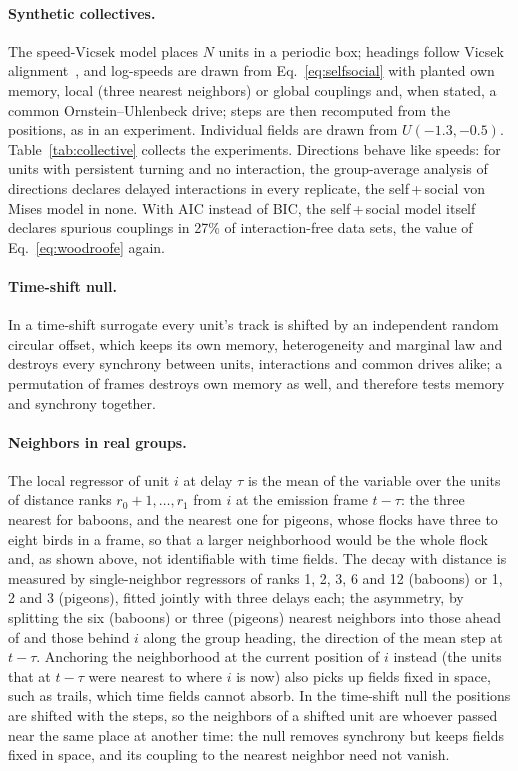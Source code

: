 \paragraph{Synthetic collectives.} The speed-Vicsek model places $N$ units in a periodic box; headings follow Vicsek alignment~\cite{Vicsek1995}, and log-speeds are drawn from Eq.~\eqref{eq:selfsocial} with planted own memory, local (three nearest neighbors) or global couplings and, when stated, a common Ornstein--Uhlenbeck drive; steps are then recomputed from the positions, as in an experiment. Individual fields are drawn from $U(-1.3,-0.5)$. Table~\ref{tab:collective} collects the experiments. Directions behave like speeds: for units with persistent turning and no interaction, the group-average analysis of directions declares delayed interactions in every replicate, the self\,+\,social von Mises model in none. With AIC instead of BIC, the self\,+\,social model itself declares spurious couplings in 27\% of interaction-free data sets, the value of Eq.~\eqref{eq:woodroofe} again.

\paragraph{Time-shift null.} In a time-shift surrogate every unit's track is shifted by an independent random circular offset, which keeps its own memory, heterogeneity and marginal law and destroys every synchrony between units, interactions and common drives alike; a permutation of frames destroys own memory as well, and therefore tests memory and synchrony together.

\paragraph{Neighbors in real groups.} The local regressor of unit $i$ at delay $\tau$ is the mean of the variable over the units of distance ranks $r_0+1,\dots,r_1$ from $i$ at the emission frame $t-\tau$: the three nearest for baboons, and the nearest one for pigeons, whose flocks have three to eight birds in a frame, so that a larger neighborhood would be the whole flock and, as shown above, not identifiable with time fields. The decay with distance is measured by single-neighbor regressors of ranks 1, 2, 3, 6 and 12 (baboons) or 1, 2 and 3 (pigeons), fitted jointly with three delays each; the asymmetry, by splitting the six (baboons) or three (pigeons) nearest neighbors into those ahead of and those behind $i$ along the group heading, the direction of the mean step at $t-\tau$. Anchoring the neighborhood at the current position of $i$ instead (the units that at $t-\tau$ were nearest to where $i$ is now) also picks up fields fixed in space, such as trails, which time fields cannot absorb. In the time-shift null the positions are shifted with the steps, so the neighbors of a shifted unit are whoever passed near the same place at another time: the null removes synchrony but keeps fields fixed in space, and its coupling to the nearest neighbor need not vanish.
